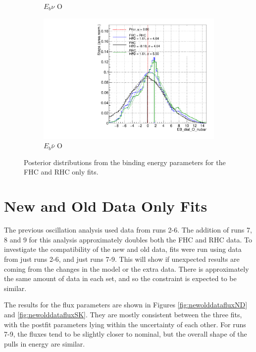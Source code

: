 \begin{figure}
\begin{subfigure}{.48\textwidth}
  \caption{$E_{b}\nu$ O}
\end{subfigure}
\begin{subfigure}{.48\textwidth}
  \centering
  \includegraphics[width=0.73\linewidth]{figs/FHCRHC_EB_dial_O_nubar}
  \caption{$E_{b}\bar{\nu}$ O}
\end{subfigure}
\caption{Posterior distributions from the binding energy parameters for the FHC and RHC only fits.}
\label{fig:FHCRHCEbdata}
\end{figure}

\section{New and Old Data Only Fits}

The previous oscillation analysis\cite{PhysRevLett.121.171802} used data from runs 2-6. The addition of runs 7, 8 and 9 for this analysis approximately doubles both the FHC and RHC data. To investigate the compatibility of the new and old data, fits were run using data from just runs 2-6, and just runs 7-9. This will show if unexpected results are coming from the changes in the model or the extra data. There is approximately the same amount of data in each set, and so the constraint is expected to be similar.

The results for the flux parameters are shown in Figures \ref{fig:newolddatafluxND} and \ref{fig:newolddatafluxSK}. They are mostly consistent between the three fits, with the postfit parameters lying within the uncertainty of each other. For runs 7-9, the fluxes tend to be slightly closer to nominal, but the overall shape of the pulls in energy are similar.

